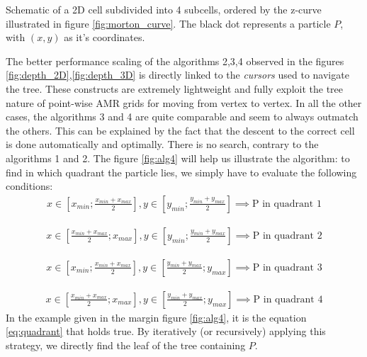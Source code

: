 \documentclass[
	a4paper,
	12pt,
	raggedright,
	twoside
]{tufte-style-article}
\theoremstyle{definition}
\theoremstyle{remark}
\begin{document}
\begin{marginfigure}
    \centering
    
    \caption{Schematic of a 2D cell subdivided into 4 subcells, ordered by the z-curve illustrated in figure \ref{fig:morton_curve}. The black dot represents a particle $P$, with $(x,y)$ as it's coordinates. \label{fig:alg4}}
\end{marginfigure}

The better performance scaling of the algorithms 2,3,4 observed in the figures \ref{fig:depth_2D},\ref{fig:depth_3D} is directly linked to the \textit{cursors} used to navigate the tree. These constructs are extremely lightweight and fully exploit the tree nature of point-wise \Gls{AMR} grids for moving from vertex to vertex.
In all the other cases, the algorithms 3 and 4 are quite comparable and seem to always outmatch the others. This can be explained by the fact that the descent to the correct cell is done automatically and optimally. There is no search, contrary to the algorithms 1 and 2. The figure \ref{fig:alg4} will help us illustrate the algorithm: to find in which quadrant the particle lies, we simply have to evaluate the following conditions:
\begin{align}
x \in \left [ x_{min}; \frac{x_{min}+x_{max}}{2} \right ],
y \in \left [ y_{min}; \frac{y_{min}+y_{max}}{2} \right ]
\implies \text{P in quadrant 1}
\end{align}

\begin{align}\label{eq:quadrant}
x \in \left [ \frac{x_{min}+x_{max}}{2}; x_{max} \right ],
y \in \left [ y_{min}; \frac{y_{min}+y_{max}}{2} \right ]
\implies \text{P in quadrant 2}
\end{align}

\begin{align}
x \in \left [ x_{min}; \frac{x_{min}+x_{max}}{2} \right ],
y \in \left [ \frac{y_{min}+y_{max}}{2}; y_{max} \right ]
\implies \text{P in quadrant 3}
\end{align}

\begin{align}
x \in \left [ \frac{x_{min}+x_{max}}{2}; x_{max} \right ],
y \in \left [ \frac{y_{min}+y_{max}}{2}; y_{max} \right ]
\implies \text{P in quadrant 4}
\end{align}
In the example given in the margin figure \ref{fig:alg4}, it is the equation \ref{eq:quadrant} that holds true. By iteratively (or recursively) applying this strategy, we directly find the leaf of the tree containing $P$.
\end{document}

